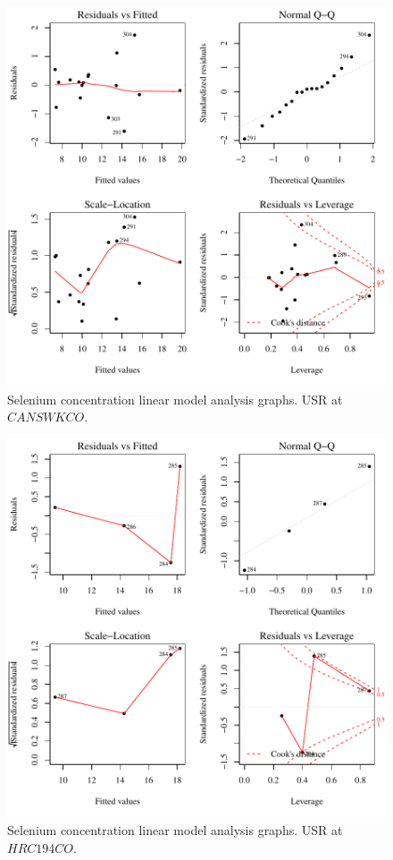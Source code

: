 \begin{figure}[htbp]
	\begin{center}
	\includegraphics[width=6in]{"Figures/Results_USR/Conc Model lm-fit CAN"}
	\caption{Selenium concentration linear model analysis graphs.  USR at $CANSWKCO$.}
	\end{center}
\end{figure}
\newpage

\begin{figure}[htbp]
	\begin{center}
	\includegraphics[width=6in]{"Figures/Results_USR/Conc Model lm-fit HRC"}
	\caption{Selenium concentration linear model analysis graphs.  USR at $HRC194CO$.}
	\end{center}
\end{figure}
\newpage

